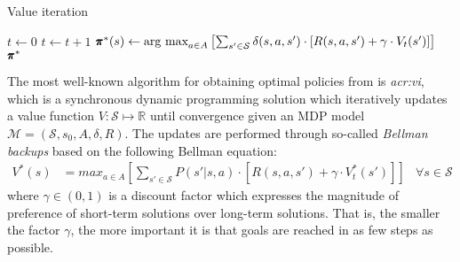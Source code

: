 \begin{algorithm}[!t]
	\caption{Value iteration}
	\label{alg:vi}
	\begin{algorithmic}[1]
		\State $t \gets 0$
		\Repeat
		\State $t \gets t + 1$
		\EndFor
		\State $\pmb{\pi}^*(s) \gets \text{arg max}_{a \in A} \left[\sum_{s' \in \mathcal{S}} \delta(s, a, s') \cdot \left[R(s, a, s') + \gamma \cdot V_{t}(s')\right]\right]$
		\EndFor
		\State\Return $\pmb{\pi}^*$
	\end{algorithmic}
\end{algorithm}

The most well-known algorithm for obtaining optimal policies from  is \textit{\acrfull{acr:vi}}, which is a synchronous dynamic programming solution which iteratively updates a value function $V: \mathcal{S} \mapsto \mathbb{R}$ until convergence given an MDP model $\mathcal{M} = (\mathcal{S}, s_0, A, \delta, R)$.
The updates are performed through so-called \textit{Bellman backups} based on the following Bellman equation:
\begin{align}
V^*(s) &= max_{a \in A} \left[\sum_{s' \in \mathcal{S}} P(s' \vert s, a) \cdot \left[R(s, a, s') + \gamma \cdot V^*_{t}(s')\right]\right]	&\forall s \in \mathcal{S}
\end{align}
where $\gamma \in (0,1)$ is a discount factor which expresses the magnitude of preference of short-term solutions over long-term solutions. That is, the smaller the factor $\gamma$, the more important it is that goals are reached in as few steps as possible.

